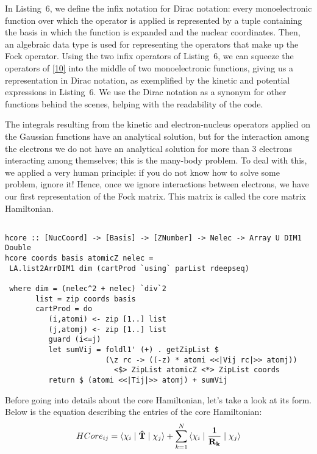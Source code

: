 \documentclass{tmr}
\begin{document}
In Listing~6, we define the infix notation for Dirac notation:
every monoelectronic function over which the operator is applied
is represented by a tuple containing the basis in which the function is expanded
and the nuclear coordinates. Then, an algebraic data type is used for representing the
operators that make up the Fock operator. Using the two infix operators of Listing~6,
we can squeeze the operators of \eqref{10} into the middle of
two monoelectronic functions, giving us a representation in Dirac notation, as exemplified
by the kinetic and potential expressions in Listing~6. We use the Dirac notation as a
synonym for other functions behind the scenes, helping with the readability of the code.

The integrals resulting from the kinetic and electron-nucleus operators applied on
the Gaussian functions have an analytical solution, but for the interaction among the electrons we do not have 
an analytical solution for more than 3 electrons interacting among themselves; this is the
many-body problem. To deal with this, we applied a very human principle: if you do not know how to solve some problem, ignore it!
Hence, once we ignore interactions between electrons, we have our first representation of
the Fock matrix. This matrix is called the core matrix Hamiltonian.

\begin{lstlisting}[float,captionpos=b,belowcaptionskip=4pt, caption= Core Hamiltonian]

hcore :: [NucCoord] -> [Basis] -> [ZNumber] -> Nelec -> Array U DIM1 Double
hcore coords basis atomicZ nelec = 
 LA.list2ArrDIM1 dim (cartProd `using` parList rdeepseq)

 where dim = (nelec^2 + nelec) `div`2
       list = zip coords basis       
       cartProd = do
          (i,atomi) <- zip [1..] list
          (j,atomj) <- zip [1..] list
          guard (i<=j)
          let sumVij = foldl1' (+) . getZipList $
                       (\z rc -> ((-z) * atomi <<|Vij rc|>> atomj))
                         <$> ZipList atomicZ <*> ZipList coords
          return $ (atomi <<|Tij|>> atomj) + sumVij

\end{lstlisting}
 
\par Before going into details about the core Hamiltonian,
let's take a look at its form. Below is the equation
describing the entries of the core Hamiltonian:
\begin{equation}\label{15}
HCore_{ij} =\braket{\chi_{i} \mid \mathbf{\hat T} \mid \chi_{j}} + 
\sum_{k=1}^{N} \braket{\chi_{i} \mid \mathbf{\frac{1}{R_{k}}} \mid \chi_{j}} 
\end{equation}
\end{document}
